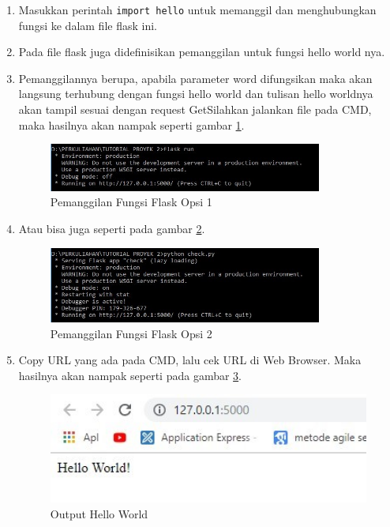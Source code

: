 \begin{enumerate}
\item Masukkan perintah \verb|import hello| untuk memanggil dan menghubungkan fungsi ke dalam file flask ini.
\item Pada file flask juga didefinisikan pemanggilan untuk fungsi hello world nya.
\item Pemanggilannya berupa, apabila parameter word difungsikan maka akan langsung terhubung dengan fungsi hello world dan tulisan hello worldnya akan tampil sesuai dengan request GetSilahkan jalankan file pada CMD, maka hasilnya akan nampak seperti gambar \ref{fig:call_function1}.
\begin{figure}[!htbp]
	\centerline{\includegraphics[width=0.85\textwidth]{figures/8/call_function1.jpg}}
	\caption{Pemanggilan Fungsi Flask Opsi 1}
	\label{fig:call_function1}
\end{figure} 
 
\item Atau bisa juga seperti pada gambar \ref{fig:call_function2}.
\begin{figure}[!htbp]
	\centerline{\includegraphics[width=0.85\textwidth]{figures/8/call_function2.jpg}}
	\caption{Pemanggilan Fungsi Flask Opsi 2}
	\label{fig:call_function2}
\end{figure} 
 
\item Copy URL yang ada pada CMD, lalu cek URL di Web Browser. Maka hasilnya akan nampak seperti pada gambar \ref{fig:hello_world}.
\begin{figure}[!htbp]
	\centerline{\includegraphics[width=1\textwidth]{figures/8/hello_world.jpg}}
	\caption{Output Hello World}
	\label{fig:hello_world}
\end{figure} 
\end{enumerate} 

